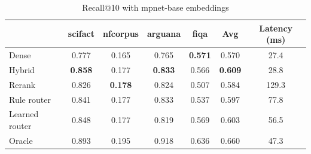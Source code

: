 \begin{table}[t]
\centering
\caption{Recall@10 with mpnet-base embeddings}
\label{tab:recall_mpnet-base}
\begin{tabular}{lcccccc}
\toprule
 & scifact & nfcorpus & arguana & fiqa & Avg & Latency (ms) \\
\midrule
Dense & 0.777 & 0.165 & 0.765 & \textbf{0.571} & 0.570 & 27.4 \\
Hybrid & \textbf{0.858} & 0.177 & \textbf{0.833} & 0.566 & \textbf{0.609} & 28.8 \\
Rerank & 0.826 & \textbf{0.178} & 0.824 & 0.507 & 0.584 & 129.3 \\
\midrule
Rule router & 0.841 & 0.177 & 0.833 & 0.537 & 0.597 & 77.8 \\
Learned router & 0.848 & 0.177 & 0.819 & 0.569 & 0.603 & 56.5 \\
Oracle & 0.893 & 0.195 & 0.918 & 0.636 & 0.660 & 47.3 \\
\bottomrule
\end{tabular}
\end{table}